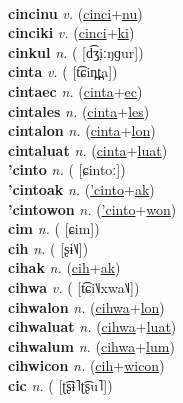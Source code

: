 \label{cincilum} \\
\textbf{cincinu} \textit{v.} (\hyperref[cinci]{cinci}+\hyperref[nu]{nu})
 \label{cincinu} \\
\textbf{cinciki} \textit{v.} (\hyperref[cinci]{cinci}+\hyperref[ki]{ki})
 \label{cinciki} \\
\textbf{cinkul} \textit{n.} ( [d͡ʒ̤iːŋɡur])
 \label{cinkul} \\
\textbf{cinta} \textit{v.} ( [t͡ɕin̪t̪a])
 \label{cinta} \\
\textbf{cintaec} \textit{n.} (\hyperref[cinta]{cinta}+\hyperref[ec]{ec})
 \label{cintaec} \\
\textbf{cintales} \textit{n.} (\hyperref[cinta]{cinta}+\hyperref[les]{les})
 \label{cintales} \\
\textbf{cintalon} \textit{n.} (\hyperref[cinta]{cinta}+\hyperref[lon]{lon})
 \label{cintalon} \\
\textbf{cintaluat} \textit{n.} (\hyperref[cinta]{cinta}+\hyperref[luat]{luat})
 \label{cintaluat} \\
\textbf{'cinto} \textit{n.} ( [ɕintoː])
 \label{'cinto} \\
\textbf{'cintoak} \textit{n.} (\hyperref['cinto]{'cinto}+\hyperref[ak]{ak})
 \label{'cintoak} \\
\textbf{'cintowon} \textit{n.} (\hyperref['cinto]{'cinto}+\hyperref[won]{won})
 \label{'cintowon} \\
\textbf{cim} \textit{n.} ( [ɕim])
 \label{cim} \\
\textbf{cih} \textit{n.} ( [ʂɨ˥˩])
 \label{cih} \\
\textbf{cihak} \textit{n.} (\hyperref[cih]{cih}+\hyperref[ak]{ak})
 \label{cihak} \\
\textbf{cihwa} \textit{v.} ( [t͡ɕi˥˩xwa˥˩])
 \label{cihwa} \\
\textbf{cihwalon} \textit{n.} (\hyperref[cihwa]{cihwa}+\hyperref[lon]{lon})
 \label{cihwalon} \\
\textbf{cihwaluat} \textit{n.} (\hyperref[cihwa]{cihwa}+\hyperref[luat]{luat})
 \label{cihwaluat} \\
\textbf{cihwalum} \textit{n.} (\hyperref[cihwa]{cihwa}+\hyperref[lum]{lum})
 \label{cihwalum} \\
\textbf{cihwicon} \textit{n.} (\hyperref[cih]{cih}+\hyperref[wicon]{wicon})
 \label{cihwicon} \\
\textbf{cic} \textit{n.} ( [ʈ͡ʂɨ˥ʈ͡ʂu˥])
 \label{cic} \\
